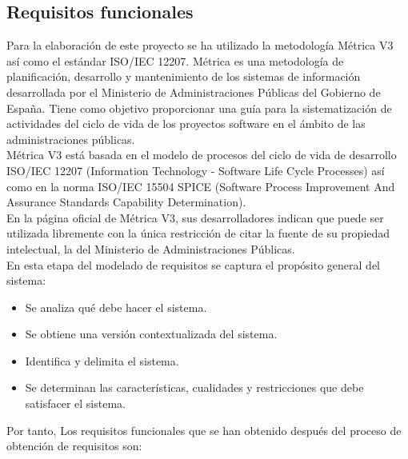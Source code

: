 \subsection{Requisitos funcionales}

Para la elaboración de este proyecto se ha utilizado la metodología Métrica V3 así como el estándar ISO/IEC 12207. Métrica es una metodología de planificación, desarrollo y
mantenimiento de los sistemas de información desarrollada por el Ministerio de Administraciones Públicas del Gobierno de España. Tiene como objetivo proporcionar una guía para 
la sistematización de actividades del ciclo de vida de los proyectos software en el ámbito de las administraciones públicas.\\

Métrica V3 \cite{website:metrica} está basada en el modelo de procesos del ciclo de vida de desarrollo ISO/IEC 12207 (Information Technology - Software Life Cycle Processes) así como
en la norma ISO/IEC 15504 SPICE (Software Process Improvement And Assurance Standards Capability Determination).\\

En la página oficial de Métrica V3, sus desarrolladores indican que puede ser utilizada libremente con la única restricción de citar la fuente de su propiedad intelectual, 
la del Ministerio de Administraciones Públicas.\\

En esta etapa del modelado de requisitos se captura el propósito general del sistema:

\begin{itemize}
  \item Se analiza qué debe hacer el sistema.
  \item Se obtiene una versión contextualizada del sistema.
  \item Identifica y delimita el sistema.
  \item Se determinan las características, cualidades y restricciones que debe satisfacer el sistema.
\end{itemize}


Por tanto, Los requisitos funcionales que se han obtenido después del proceso de obtención de requisitos son:\\

